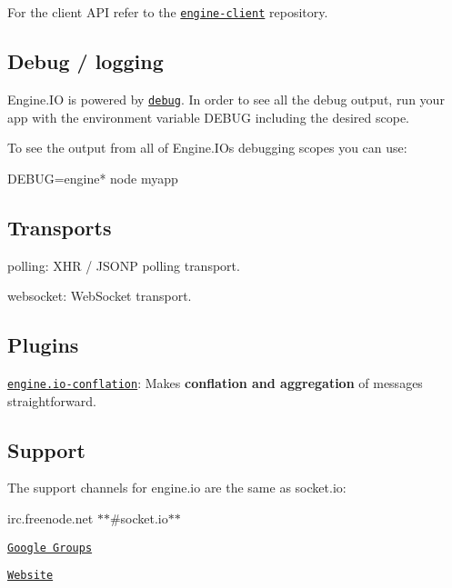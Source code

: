 For the client A\+PI refer to the \href{http://github.com/learnboost/engine.io-client}{\tt engine-\/client} repository.

\subsection*{Debug / logging}

Engine.\+IO is powered by \href{http://github.com/visionmedia/debug}{\tt debug}. In order to see all the debug output, run your app with the environment variable {\ttfamily D\+E\+B\+UG} including the desired scope.

To see the output from all of Engine.\+IO\textquotesingle{}s debugging scopes you can use\+:


\begin{DoxyCode}
DEBUG=engine* node myapp
\end{DoxyCode}


\subsection*{Transports}


\begin{DoxyItemize}
\item {\ttfamily polling}\+: X\+HR / J\+S\+O\+NP polling transport.
\item {\ttfamily websocket}\+: Web\+Socket transport.
\end{DoxyItemize}

\subsection*{Plugins}


\begin{DoxyItemize}
\item \href{https://github.com/EugenDueck/engine.io-conflation}{\tt engine.\+io-\/conflation}\+: Makes {\bfseries conflation and aggregation} of messages straightforward.
\end{DoxyItemize}

\subsection*{Support}

The support channels for {\ttfamily engine.\+io} are the same as {\ttfamily socket.\+io}\+:
\begin{DoxyItemize}
\item irc.\+freenode.\+net $\ast$$\ast$\#socket.\+io$\ast$$\ast$
\item \href{http://groups.google.com/group/socket_io}{\tt Google Groups}
\item \href{http://socket.io}{\tt Website}
\end{DoxyItemize}

